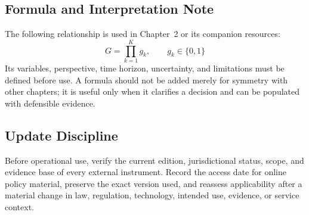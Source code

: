\subsection{Formula and Interpretation Note}
The following relationship is used in Chapter~2 or its companion resources:
\begin{equation}
G=\prod_{k=1}^{K}g_k,\qquad g_k\in\{0,1\}
\label{eq:comp-ch02-reference-formula}
\end{equation}
Its variables, perspective, time horizon, uncertainty, and limitations must be
defined before use. A formula should not be added merely for symmetry with other
chapters; it is useful only when it clarifies a decision and can be populated with
defensible evidence.

\subsection{Update Discipline}
Before operational use, verify the current edition, jurisdictional status, scope,
and evidence base of every external instrument. Record the access date for online
policy material, preserve the exact version used, and reassess applicability after a
material change in law, regulation, technology, intended use, evidence, or service
context.
